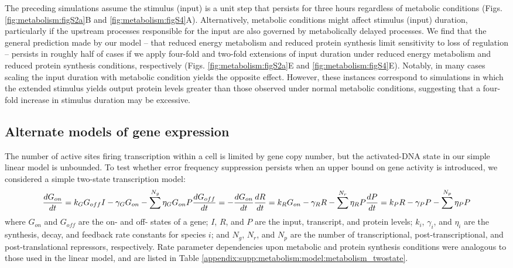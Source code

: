 The preceding simulations assume the stimulus (input) is a unit step that persists for three hours regardless of metabolic conditions (Figs. \ref{fig:metabolism:figS2a}B and \ref{fig:metabolism:figS4}A). Alternatively, metabolic conditions might affect stimulus (input) duration, particularly if the upstream processes responsible for the input are also governed by metabolically delayed processes. We find that the general prediction made by our model -- that reduced energy metabolism and reduced protein synthesis limit sensitivity to loss of regulation -- persists in roughly half of cases if we apply four-fold and two-fold extensions of input duration under reduced energy metabolism and reduced protein synthesis conditions, respectively (Figs. \ref{fig:metabolism:figS2a}E and \ref{fig:metabolism:figS4}E). Notably, in many cases scaling the input duration with metabolic condition yields the opposite effect. However, these instances correspond to simulations in which the extended stimulus yields output protein levels greater than those observed under normal metabolic conditions, suggesting that a four-fold increase in stimulus duration may be excessive.

\subsection{Alternate models of gene expression}
\label{appendix:supp:metabolism:model:alt_models}

The number of active sites firing transcription within a cell is limited by gene copy number, but the activated-DNA state in our simple linear model is unbounded. To test whether error frequency suppression persists when an upper bound on gene activity is introduced, we considered a simple two-state transcription model:
\begin{equation}
\label{appendix:supp:metabolism:model:twostate_eqns}
\frac{dG_{on}}{dt} = k_{G}G_{off}I -\gamma_G G_{on} - \sum^{N_g}{\eta_{G} G_{on}P} \\
\frac{dG_{off}}{dt} = -\frac{dG_{on}}{dt} \\
\frac{dR}{dt} = k_{R} G_{on} -\gamma_R R -\sum^{N_r}{\eta_{R} P} \\
\frac{dP}{dt} = k_{P} R -\gamma_P P -\sum^{N_p}{\eta_{P} P}
\end{equation}
where $G_{on}$ and $G_{off}$ are the on- and off- states of a gene; $I$, $R$, and $P$ are the input, transcript, and protein levels; $k_i$, $\gamma_i$, and $\eta_i$ are the synthesis, decay, and feedback rate constants for species $i$; and $N_g$, $N_r$, and $N_p$ are the number of transcriptional, post-transcriptional, and post-translational repressors, respectively. Rate parameter dependencies upon metabolic and protein synthesis conditions were analogous to those used in the linear model, and are listed in Table \ref{appendix:supp:metabolism:model:metabolism_twostate}.

